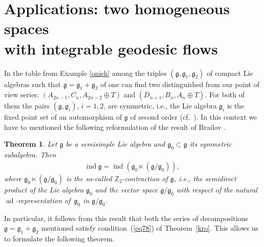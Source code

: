 \documentclass[pdftex]{sigma}
\numberwithin{equation}{section}
\newtheorem{Theorem}{Theorem}[section]
\begin{document}
\section[Applications: two homogeneous spaces with integrable geodesic flows]{Applications: two homogeneous spaces\\ with integrable geodesic flows}\label{s.appl}

In the table from Example \ref{onish} among the triples $(\mathfrak{g},\mathfrak{g}_1,\mathfrak{g}_2)$ of compact Lie algebras such that $\mathfrak{g}=\mathfrak{g}_1+\mathfrak{g}_2$ of one can find two distinguished from our point of view series: $(A_{2n-1},C_n,A_{2n-2}\oplus T)$ and $(D_{n+1},B_n,A_n\oplus T)$. For both of them the pairs $(\mathfrak{g},\mathfrak{g}_i)$, $i=1,2$, are symmetric, i.e., the Lie algebra $\mathfrak{g}_i$ is the fixed point set of an automorphism of $\mathfrak{g}$ of second order (cf.\ \cite[Tables II, III, Section~6, Chapter~X]{helgason}). In this context we have to mentioned the following reformulation of the result of Brailov \cite[Theorem~5, Section~37]{TFbols}.

\begin{Theorem}\label{brailov} Let $\mathfrak{g}$ be a semisimple Lie algebra and $\mathfrak{g}_0 \subset\mathfrak{g}$ its symmetric subalgebra. Then \begin{gather*}
\operatorname{ind} \mathfrak{g}=\operatorname{ind} (\mathfrak{g}_0\ltimes(\mathfrak{g}/\mathfrak{g}_0)),
\end{gather*}
where $\mathfrak{g}_0\ltimes(\mathfrak{g}/\mathfrak{g}_0)$ is the so-called $\mathbb{Z}_2$-contraction of $\mathfrak{g}$, i.e., the semidirect product of the Lie algebra $\mathfrak{g}_0$ and the vector space $\mathfrak{g}/\mathfrak{g}_0$ with respect of the natural $\operatorname{ad}$-representation of~$\mathfrak{g}_0$ in $\mathfrak{g}/\mathfrak{g}_0$.
\end{Theorem}
In particular, it follows from this result that both the series of decompositions $\mathfrak{g}=\mathfrak{g}_1+\mathfrak{g}_2$ mentioned satisfy condition~(\ref{eq78}) of Theorem~\ref{kro}. This allows us to formulate the following theorem.
\end{document}
